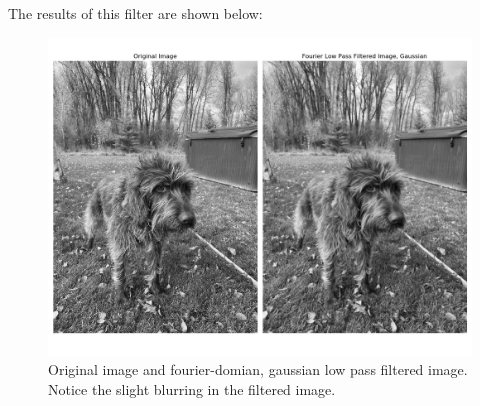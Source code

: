 \documentclass[]{article}
\begin{document}
The results of this filter are shown below:
	
	\begin{figure}[H]
		\centering
		\includegraphics[width=6.5in]{p1_output/img_0_f_gaussian.png}
		\caption{Original image and fourier-domian, gaussian low pass filtered image. Notice the slight blurring in the filtered image.}
	\end{figure}
%	
%	
\end{document}
